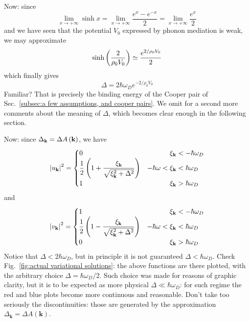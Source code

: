 Now: since
\[
	\lim_{x\to+\infty} \sinh x = \lim_{x\to+\infty} \frac{e^x - e^{-x}}{2} = \lim_{x\to+\infty} \frac{e^x}{2}
\]
and we have seen that the potential $V_0$ expressed by phonon mediation is weak, we may approximate
\[
	\sinh\left({\frac{2}{\rho_0 V_0}}\right) \simeq \frac{e^{2/\rho_0 V_0}}{2}
\]
which finally gives
\[
	\Delta = 2 \hbar\omega_D e^{-2/\rho_0 V_0}
\]
Familiar? That is precisely the binding energy of the Cooper pair of Sec.~\ref{subsec:a few assumptions, and cooper pairs}. We omit for a second more comments about the meaning of $\Delta$, which becomes clear enough in the following section.

Now: since $\Delta_\mathbf{k} = \Delta A\left({\mathbf{k}}\right)$, we have
\begin{equation}\label{eq:u actual variational solution}
	\abs{u_\mathbf{k}}^2 = \begin{cases}
		0 &\hphantom{-\hbar\omega <{}}\xi_\mathbf{k} < -\hbar\omega_D\\
		\displaystyle\frac{1}{2} \lrR{1 + \frac{\xi_\mathbf{k}}{\sqrt{\xi_\mathbf{k}^2 + \Delta^2}}} &-\hbar\omega <\xi_\mathbf{k} < \hbar\omega_D\\
		1 &\hphantom{-\hbar\omega <{}}\xi_\mathbf{k} > \hbar\omega_D
	\end{cases}
\end{equation}
and
\begin{equation}\label{eq:v actual variational solution}
	\abs{v_\mathbf{k}}^2 = \begin{cases}
		1 &\hphantom{-\hbar\omega <{}}\xi_\mathbf{k} < -\hbar\omega_D\\
		\displaystyle\frac{1}{2} \lrR{1 - \frac{\xi_\mathbf{k}}{\sqrt{\xi_\mathbf{k}^2 + \Delta^2}}} &-\hbar\omega <\xi_\mathbf{k} < \hbar\omega_D\\
		0 &\hphantom{-\hbar\omega <{}}\xi_\mathbf{k} > \hbar\omega_D
	\end{cases}
\end{equation}
Notice that $\Delta < 2\hbar\omega_D$, but in principle it is not guaranteed $\Delta < \hbar\omega_D$. Check Fig.~\ref{fig:actual variational solutions}: the above functions are there plotted, with the arbitrary choice $\Delta = \hbar\omega_D/2$. Such choice was made for reasons of graphic clarity, but it is to be expected as more physical $\Delta \ll \hbar\omega_D$: for such regime the red and blue plots become more continuous and reasonable. Don't take too seriously the discontinuities: those are generated by the approximation $\Delta_\mathbf{k} = \Delta A(\mathbf{k})$.

